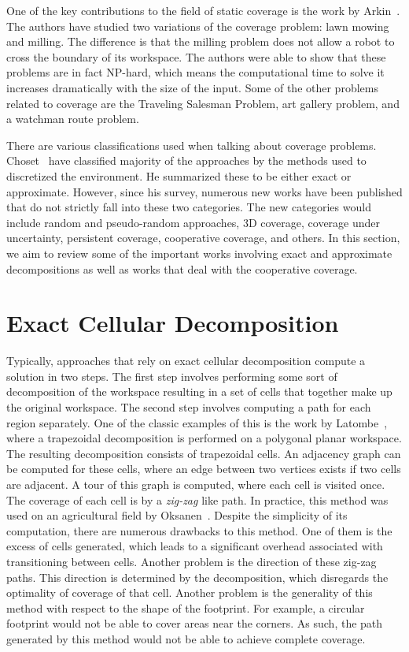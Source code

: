 \documentclass[../main.tex]{subfiles}
\begin{document}
One of the key contributions to the field of static coverage is the work by Arkin~\cite{arkin2000approximation}. The authors have studied two variations of the coverage problem: lawn mowing and milling. The difference is that the milling problem does not allow a robot to cross the boundary of its workspace. The authors were able to show that these problems are in fact NP-hard, which means the computational time to solve it increases dramatically with the size of the input. Some of the other problems related to coverage are the Traveling Salesman Problem, art gallery problem, and a watchman route problem.

There are various classifications used when talking about coverage problems. Choset~\cite{choset2000coverage} have classified majority of the approaches by the methods used to discretized the environment. He summarized these to be either exact or approximate. However, since his survey, numerous new works have been published that do not strictly fall into these two categories. The new categories would include random and pseudo-random approaches, 3D coverage, coverage under uncertainty, persistent coverage, cooperative coverage, and others. In this section, we aim to review some of the important works involving exact and approximate decompositions as well as works that deal with the cooperative coverage.


\section{Exact Cellular Decomposition}
\label{section:exact_cellular_decomposition}

Typically, approaches that rely on exact cellular decomposition compute a solution in two steps. The first step involves performing some sort of decomposition of the workspace resulting in a set of cells that together make up the original workspace. The second step involves computing a path for each region separately. One of the classic examples of this is the work by Latombe~\cite{latombe1991exact}, where a trapezoidal decomposition is performed on a polygonal planar workspace. The resulting decomposition consists of trapezoidal cells. An adjacency graph can be computed for these cells, where an edge between two vertices exists if two cells are adjacent. A tour of this graph is computed, where each cell is visited once. The coverage of each cell is by a \emph{zig-zag} like path.  In practice, this method was used on an agricultural field by Oksanen~\cite{Oksanen2009coverage}. Despite the simplicity of its computation, there are numerous drawbacks to this method. One of them is the excess of cells generated, which leads to a significant overhead associated with transitioning between cells. Another problem is the direction of these zig-zag paths. This direction is determined by the decomposition, which disregards the optimality of coverage of that cell. Another problem is the generality of this method with respect to the shape of the footprint. For example, a circular footprint would not be able to cover areas near the corners. As such, the path generated by this method would not be able to achieve complete coverage.
\end{document}
